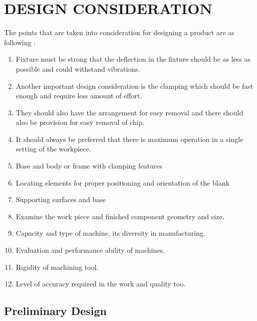 \documentclass[16pt,a4paper]{article}
\begin{document}
\pagebreak

\section{DESIGN CONSIDERATION}
The points that are taken into consideration for designing a product are as following :


\begin{enumerate}
\item Fixture must be strong that the deflection in the fixture should be as less as possible and could withstand vibrations.
\item Another important design consideration is the clamping which should be fast enough and require less amount of effort.
\item They should also have the arrangement for easy removal  and there should also be provision for easy removal of chip.
\item It should always be preferred that there is maximum operation in a single setting of the workpiece. 
\item Base and body or frame with clamping features 
\item Locating elements for proper positioning and orientation of the blank 
\item Supporting surfaces and base 
\item Examine the work piece and finished component geometry and size.
\item Capacity and type of machine, its diversity in manufacturing.
\item Evaluation and performance ability of machines.
\item Rigidity of machining tool.
\item Level of accuracy required in the work and quality too.
\end{enumerate}

\subsection{Preliminary Design}
\end{document}
